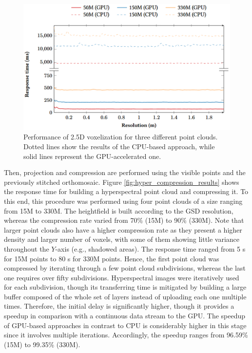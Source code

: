 \begin{figure}[bt]
    \centering
    \includegraphics[width=\linewidth]{figs/hyper_point_cloud/voxelization_results.png}
	\caption{Performance of 2.5D voxelization for three different point clouds. Dotted lines show the results of the CPU-based approach, while solid lines represent the GPU-accelerated one. }
	\label{fig:hyper_voxelization_results}
\end{figure}

Then, projection and compression are performed using the visible points and the previously stitched orthomosaic. Figure \ref{fig:hyper_compression_results} shows the response time for building a hyperspectral point cloud and compressing it. To this end, this procedure was performed using four point clouds of a size ranging from 15M to 330M. The heightfield is built according to the GSD resolution, whereas the compression rate varied from 70\% (15M) to 90\% (330M). Note that larger point clouds also have a higher compression rate as they present a higher density and larger number of voxels, with some of them showing little variance throughout the $Y$-axis (e.g., shadowed areas). The response time ranged from 5 \si{\second} for 15M points to 80 \si{\second} for 330M points. Hence, the first point cloud was compressed by iterating through a few point cloud subdivisions, whereas the last one requires over fifty subdivisions. Hyperspectral images were iteratively used for each subdivision, though its transferring time is mitigated by building a large buffer composed of the whole set of layers instead of uploading each one multiple times. Therefore, the initial delay is significantly higher, though it provides a speedup in comparison with a continuous data stream to the GPU. The speedup of GPU-based approaches in contrast to CPU is considerably higher in this stage since it involves multiple iterations. Accordingly, the speedup ranges from 96.59\% (15M) to 99.35\% (330M).

